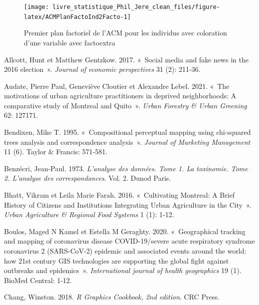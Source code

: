 \documentclass[
  11pt,
  french,
]{book}
\begin{document}
\begin{figure}

{\centering \texttt{[image: livre\_statistique\_Phil\_Jere\_clean\_files/figure-latex/ACMPlanFactoInd2Facto-1]} 

}

\caption{Premier plan factoriel de l'ACM pour les individus avec coloration d'une variable avec factoextra}\label{fig:ACMPlanFactoInd2Facto}
\end{figure}

\hypertarget{refs}{}
\leavevmode\hypertarget{ref-allcott2017social}{}%
Allcott, Hunt et Matthew Gentzkow. 2017. «~Social media and fake news in the 2016 election~». \emph{Journal of economic perspectives} 31 (2): 211‑36.

\leavevmode\hypertarget{ref-audate2021motivations}{}%
Audate, Pierre Paul, Geneviève Cloutier et Alexandre Lebel. 2021. «~The motivations of urban agriculture practitioners in deprived neighborhoods: A comparative study of Montreal and Quito~». \emph{Urban Forestry \& Urban Greening} 62: 127171.

\leavevmode\hypertarget{ref-bendixen1995compositional}{}%
Bendixen, Mike T. 1995. «~Compositional perceptual mapping using chi-squared trees analysis and correspondence analysis~». \emph{Journal of Marketing Management} 11 (6). Taylor \& Francis: 571‑581.

\leavevmode\hypertarget{ref-benzecri1973analyse}{}%
Benzécri, Jean-Paul. 1973. \emph{L'analyse des données. Tome 1. La toxinomie. Tome 2. L'analyse des correspondances}. Vol. 2. Dunod Paris.

\leavevmode\hypertarget{ref-bhatt2016cultivating}{}%
Bhatt, Vikram et Leila Marie Farah. 2016. «~Cultivating Montreal: A Brief History of Citizens and Institutions Integrating Urban Agriculture in the City~». \emph{Urban Agriculture \& Regional Food Systems} 1 (1): 1‑12.

\leavevmode\hypertarget{ref-boulos2020geographical}{}%
Boulos, Maged N Kamel et Estella M Geraghty. 2020. «~Geographical tracking and mapping of coronavirus disease COVID-19/severe acute respiratory syndrome coronavirus 2 (SARS-CoV-2) epidemic and associated events around the world: how 21st century GIS technologies are supporting the global fight against outbreaks and epidemics~». \emph{International journal of health geographics} 19 (1). BioMed Central: 1‑12.

\leavevmode\hypertarget{ref-Chang2018}{}%
Chang, Winston. 2018. \emph{R Graphics Cookbook, 2nd edition}. CRC Press.
\end{document}
